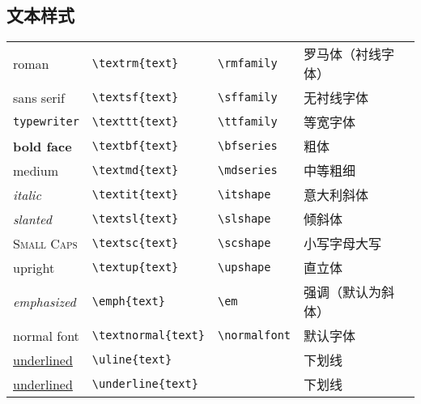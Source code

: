 \subsection{文本样式}
%
\begin{table}[h]
	\centering
	\begin{tabular}{l l l l}
		\hline
		\textrm{roman}           & \verb|\textrm{|{\color{gray}\verb|text|}\verb|}|     & \verb|\rmfamily|   & 罗马体（衬线字体） \\
		\textsf{sans serif}      & \verb|\textsf{|{\color{gray}\verb|text|}\verb|}|     & \verb|\sffamily|   & 无衬线字体 \\
		\texttt{typewriter}      & \verb|\texttt{|{\color{gray}\verb|text|}\verb|}|     & \verb|\ttfamily|   & 等宽字体 \\
		\hline
		\textbf{bold face}       & \verb|\textbf{|{\color{gray}\verb|text|}\verb|}|     & \verb|\bfseries|   & 粗体 \\
		\textmd{medium}          & \verb|\textmd{|{\color{gray}\verb|text|}\verb|}|     & \verb|\mdseries|   & 中等粗细 \\
		\hline
		\textit{italic}          & \verb|\textit{|{\color{gray}\verb|text|}\verb|}|     & \verb|\itshape|    & 意大利斜体 \\
		\textsl{slanted}         & \verb|\textsl{|{\color{gray}\verb|text|}\verb|}|     & \verb|\slshape|    & 倾斜体 \\
		\textsc{Small Caps}      & \verb|\textsc{|{\color{gray}\verb|text|}\verb|}|     & \verb|\scshape|    & 小写字母大写 \\
		\textup{upright}         & \verb|\textup{|{\color{gray}\verb|text|}\verb|}|     & \verb|\upshape|    & 直立体 \\
		\hline
		\emph{emphasized}        & \verb|\emph{|{\color{gray}\verb|text|}\verb|}|       & \verb|\em|         & 强调（默认为斜体） \\
		\textnormal{normal font} & \verb|\textnormal{|{\color{gray}\verb|text|}\verb|}| & \verb|\normalfont| & 默认字体 \\
		\uline{underlined}       & \verb|\uline{|{\color{gray}\verb|text|}\verb|}|      &                    & 下划线 \\
		\underline{underlined}   & \verb|\underline{|{\color{gray}\verb|text|}\verb|}|  &                    & 下划线 \\
		\hline
	\end{tabular}
\end{table}
%

